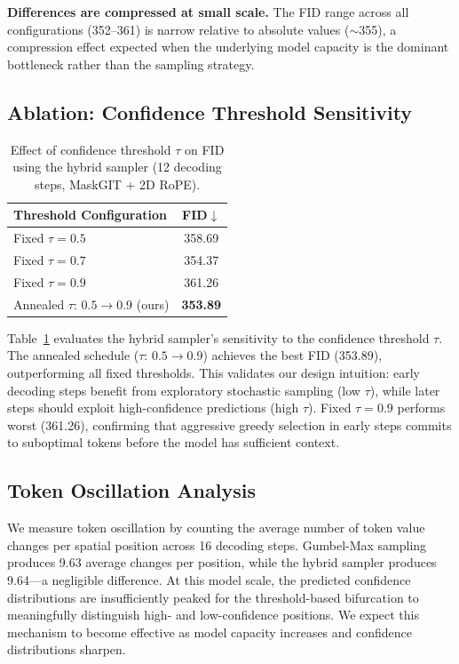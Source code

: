 \documentclass[conference]{IEEEtran}
\begin{document}
\textbf{Differences are compressed at small scale.} The FID range across all configurations (352--361) is narrow relative to absolute values ($\sim$355), a compression effect expected when the underlying model capacity is the dominant bottleneck rather than the sampling strategy.


\subsection{Ablation: Confidence Threshold Sensitivity}

\begin{table}[!t]
\centering
\caption{Effect of confidence threshold $\tau$ on FID using the hybrid sampler (12 decoding steps, MaskGIT + 2D RoPE).}
\label{tab:ablation_tau}
\begin{tabular}{lc}
\toprule
\textbf{Threshold Configuration} & \textbf{FID}$\downarrow$ \\
\midrule
Fixed $\tau = 0.5$ & 358.69 \\
Fixed $\tau = 0.7$ & 354.37 \\
Fixed $\tau = 0.9$ & 361.26 \\
Annealed $\tau$: $0.5 \to 0.9$ (ours) & \textbf{353.89} \\
\bottomrule
\end{tabular}
\end{table}

Table~\ref{tab:ablation_tau} evaluates the hybrid sampler's sensitivity to the confidence threshold $\tau$. The annealed schedule ($\tau$: $0.5 \to 0.9$) achieves the best FID (353.89), outperforming all fixed thresholds. This validates our design intuition: early decoding steps benefit from exploratory stochastic sampling (low $\tau$), while later steps should exploit high-confidence predictions (high $\tau$). Fixed $\tau = 0.9$ performs worst (361.26), confirming that aggressive greedy selection in early steps commits to suboptimal tokens before the model has sufficient context.


\subsection{Token Oscillation Analysis}

We measure token oscillation by counting the average number of token value changes per spatial position across 16 decoding steps. Gumbel-Max sampling produces 9.63 average changes per position, while the hybrid sampler produces 9.64---a negligible difference. At this model scale, the predicted confidence distributions are insufficiently peaked for the threshold-based bifurcation to meaningfully distinguish high- and low-confidence positions. We expect this mechanism to become effective as model capacity increases and confidence distributions sharpen.
\end{document}
